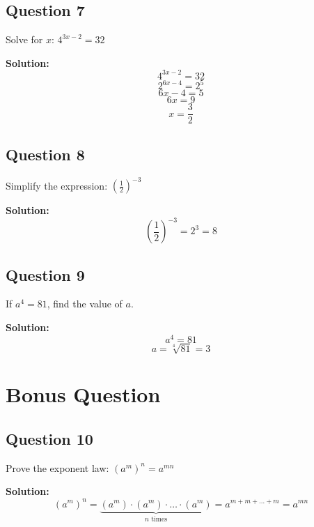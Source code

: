 \documentclass[12pt]{article}
\begin{document}
\subsection*{Question 7}
Solve for $x$: $4^{3x-2} = 32$

\textbf{Solution:}
\[4^{3x-2} = 32\]
\[2^{6x-4} = 2^5\]
\[6x - 4 = 5\]
\[6x = 9\]
\[x = \frac{3}{2}\]

\subsection*{Question 8}
Simplify the expression: $\left(\frac{1}{2}\right)^{-3}$

\textbf{Solution:}
\[\left(\frac{1}{2}\right)^{-3} = 2^3 = 8\]

\subsection*{Question 9}
If $a^4 = 81$, find the value of $a$.

\textbf{Solution:}
\[a^4 = 81\]
\[a = \sqrt[4]{81} = 3\]

\section*{Bonus Question}

\subsection*{Question 10}
Prove the exponent law: $(a^m)^n = a^{mn}$

\textbf{Solution:}
\[(a^m)^n = \underbrace{(a^m) \cdot (a^m) \cdot \ldots \cdot (a^m)}_{n \text{ times}} = a^{m + m + \ldots + m} = a^{mn}\]
\end{document}
